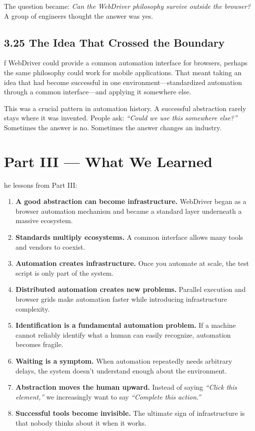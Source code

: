 \documentclass[11pt, a4paper, openany]{book}
\newcommand{\initialcap}[1]{{\fontfamily{lmss}\selectfont\huge\textbf{#1}}}
\begin{document}
The question became: \textit{Can the WebDriver philosophy survive outside the browser?} A group of engineers thought the answer was yes.

\section{3.25 The Idea That Crossed the Boundary}
\noindent \initialcap{I}f WebDriver could provide a common automation interface for browsers, perhaps the same philosophy could work for mobile applications. That meant taking an idea that had become successful in one environment---standardized automation through a common interface---and applying it somewhere else. 

This was a crucial pattern in automation history. A successful abstraction rarely stays where it was invented. People ask: \textit{``Could we use this somewhere else?''} Sometimes the answer is no. Sometimes the answer changes an industry.

\chapter*{Part III --- What We Learned}

\noindent \initialcap{T}he lessons from Part III:
\begin{enumerate}
    \item \textbf{A good abstraction can become infrastructure.} WebDriver began as a browser automation mechanism and became a standard layer underneath a massive ecosystem.
    \item \textbf{Standards multiply ecosystems.} A common interface allows many tools and vendors to coexist.
    \item \textbf{Automation creates infrastructure.} Once you automate at scale, the test script is only part of the system.
    \item \textbf{Distributed automation creates new problems.} Parallel execution and browser grids make automation faster while introducing infrastructure complexity.
    \item \textbf{Identification is a fundamental automation problem.} If a machine cannot reliably identify what a human can easily recognize, automation becomes fragile.
    \item \textbf{Waiting is a symptom.} When automation repeatedly needs arbitrary delays, the system doesn't understand enough about the environment.
    \item \textbf{Abstraction moves the human upward.} Instead of saying \textit{``Click this element,''} we increasingly want to say \textit{``Complete this action.''}
    \item \textbf{Successful tools become invisible.} The ultimate sign of infrastructure is that nobody thinks about it when it works.
\end{enumerate}
\end{document}
